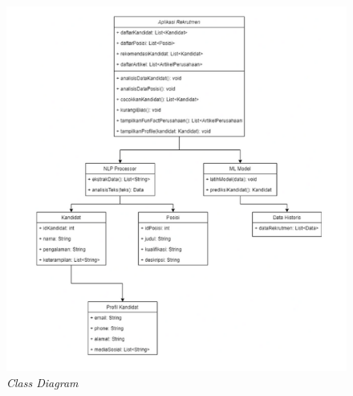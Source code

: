 \documentclass[journal,article,submit,pdftex,moreauthors]{Definitions/mdpi}
\begin{document}
\begin{figure}[H]
    \centering
    \includegraphics[width=1.0\textwidth]{image/classdiagram.png}
    \captionsetup{justification=centering}
    \caption{\textit{Class Diagram}}
    \label{fig:enter-label}
\end{figure}
\end{document}
